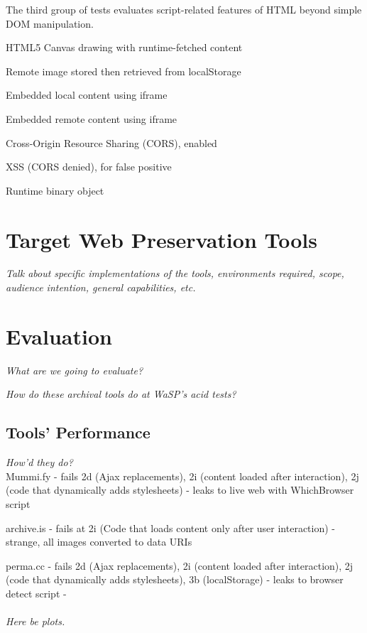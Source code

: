 \documentclass{acm_proc}
\newcommand{\todo}[1]{{\textit{\color{red}#1}}}
\begin{document}
The third group of tests evaluates script-related features of HTML beyond simple DOM manipulation.

\vspace{-1.0em}
\begin{description}\itemsep0pt \parskip0pt 
\item[3a.] HTML5 Canvas drawing with runtime-fetched content
\item[3b.] Remote image stored then retrieved from localStorage
\item[3c.] Embedded local content using iframe
\item[3d.] Embedded remote content using iframe
\item[3e.] Cross-Origin Resource Sharing (CORS), enabled
\item[3f.] XSS (CORS denied), for false positive
\item[3g.] Runtime binary object
\end{description}

\section{Target Web Preservation Tools}
\todo{Talk about specific implementations of the tools, environments required, scope, audience intention, general capabilities, etc.\\}

\section{Evaluation}
\todo{What are we going to evaluate?\\}

\todo{How do these archival tools do at WaSP's acid tests?}

\subsection{Tools' Performance}
\todo{How'd they do?\\}
Mummi.fy
- fails 2d (Ajax replacements), 2i (content loaded after interaction), 2j (code that dynamically adds stylesheets)
- leaks to live web with WhichBrowser script

archive.is
- fails at 2i (Code that loads content only after user interaction)
- strange, all images converted to data URIs

perma.cc
- fails 2d (Ajax replacements), 2i (content loaded after interaction), 2j (code that dynamically adds stylesheets), 3b (localStorage)
- leaks to browser detect script
- 
\\
\todo{\\Here be plots.\\}
\end{document}
